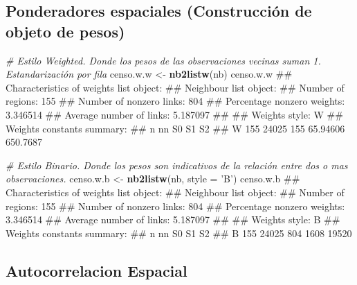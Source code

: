 \documentclass[11pt,]{article}
\newenvironment{Shaded}{\begin{snugshade}}{\end{snugshade}}
\newcommand{\KeywordTok}[1]{\textcolor[rgb]{0.13,0.29,0.53}{\textbf{#1}}}
\newcommand{\DataTypeTok}[1]{\textcolor[rgb]{0.13,0.29,0.53}{#1}}
\newcommand{\StringTok}[1]{\textcolor[rgb]{0.31,0.60,0.02}{#1}}
\newcommand{\CommentTok}[1]{\textcolor[rgb]{0.56,0.35,0.01}{\textit{#1}}}
\newcommand{\NormalTok}[1]{#1}
\begin{document}
\subsection{Ponderadores espaciales (Construcción de objeto de
pesos)}\label{ponderadores-espaciales-construcciuxf3n-de-objeto-de-pesos}

\begin{Shaded}
\begin{Highlighting}[]
\CommentTok{# Estilo Weighted. Donde los pesos de las observaciones vecinas suman 1. Estandarización por fila}
\NormalTok{censo.w.w <-}\StringTok{ }\KeywordTok{nb2listw}\NormalTok{(nb)}
\NormalTok{censo.w.w}
\NormalTok{## Characteristics of weights list object:}
\NormalTok{## Neighbour list object:}
\NormalTok{## Number of regions: 155 }
\NormalTok{## Number of nonzero links: 804 }
\NormalTok{## Percentage nonzero weights: 3.346514 }
\NormalTok{## Average number of links: 5.187097 }
\NormalTok{## }
\NormalTok{## Weights style: W }
\NormalTok{## Weights constants summary:}
\NormalTok{##     n    nn  S0       S1       S2}
\NormalTok{## W 155 24025 155 65.94606 650.7687}

\CommentTok{# Estilo Binario. Donde los pesos son indicativos de la relación entre dos o mas observaciones.}
\NormalTok{censo.w.b <-}\StringTok{ }\KeywordTok{nb2listw}\NormalTok{(nb, }\DataTypeTok{style =} \StringTok{'B'}\NormalTok{)}
\NormalTok{censo.w.b}
\NormalTok{## Characteristics of weights list object:}
\NormalTok{## Neighbour list object:}
\NormalTok{## Number of regions: 155 }
\NormalTok{## Number of nonzero links: 804 }
\NormalTok{## Percentage nonzero weights: 3.346514 }
\NormalTok{## Average number of links: 5.187097 }
\NormalTok{## }
\NormalTok{## Weights style: B }
\NormalTok{## Weights constants summary:}
\NormalTok{##     n    nn  S0   S1    S2}
\NormalTok{## B 155 24025 804 1608 19520}
\end{Highlighting}
\end{Shaded}

\subsection{Autocorrelacion Espacial}\label{autocorrelacion-espacial}
\end{document}
